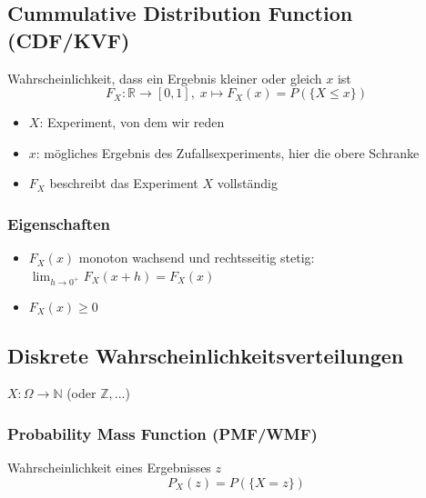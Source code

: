 \subsection{Cummulative Distribution Function (CDF/KVF)}
\begin{sectionbox}
    \begin{emphbox}
        Wahrscheinlichkeit, dass ein Ergebnis kleiner oder gleich $x$ ist
        \begin{equation*}
            F_X:\mathbb R \rightarrow [0,1], \; x\mapsto F_X(x)=P(\{X \le x\})
        \end{equation*}
        \begin{itemize}
            \item $X$: Experiment, von dem wir reden
            \item $x$: mögliches Ergebnis des Zufallsexperiments, hier die obere Schranke
            \item $F_X$ beschreibt das Experiment $X$ vollständig
        \end{itemize}
    \end{emphbox}

    \subsubsection{Eigenschaften}
    \begin{itemize}
        \item $F_X(x)$ monoton wachsend und rechtsseitig stetig: \\
              $\lim_{h\rightarrow 0^+}F_X(x + h)=F_X(x)$
        \item $F_X(x) \ge 0$
    \end{itemize}
\end{sectionbox}


\subsection{Diskrete Wahrscheinlichkeitsverteilungen}
$X:\Omega\rightarrow \mathbb N$ (oder $\mathbb Z, ...$)

\begin{sectionbox}
    \subsubsection{Probability Mass Function (PMF/WMF)}
    Wahrscheinlichkeit eines Ergebnisses $z$
    \begin{equation*}
        P_X(z)=P(\{X = z\})
    \end{equation*}
\end{sectionbox}


